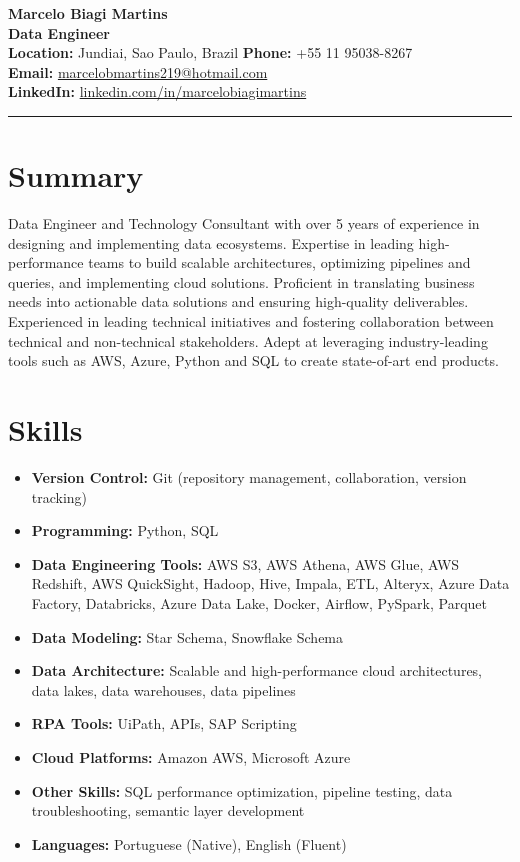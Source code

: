 \documentclass[a4paper,10pt]{article}
\begin{document}
\begin{center}
    {\LARGE \textbf{Marcelo Biagi Martins}} \\
    {\large \textbf{Data Engineer}} \\
    \textbf{Location:} Jundiai, Sao Paulo, Brazil \textbar \hspace{0.1em} \textbf{Phone:} +55 11 95038-8267 \\
    \textbf{Email:} \href{mailto:marcelobmartins219@hotmail.com}{marcelobmartins219@hotmail.com} \\
    \textbf{LinkedIn:} \href{https://www.linkedin.com/in/marcelo-biagi-martins-aa5a7616b/}{linkedin.com/in/marcelobiagimartins} \\
\end{center}

\hrule
\vspace{1em}

\section*{Summary}
Data Engineer and Technology Consultant with over 5 years of experience in designing and implementing data ecosystems. Expertise in leading high-performance teams to build scalable architectures, optimizing pipelines and queries, and implementing cloud solutions. Proficient in translating business needs into actionable data solutions and ensuring high-quality deliverables. Experienced in leading technical initiatives and fostering collaboration between technical and non-technical stakeholders. Adept at leveraging industry-leading tools such as AWS, Azure, Python and SQL to create state-of-art end products.

\section*{Skills}
\begin{itemize}[leftmargin=*]
    \item \textbf{Version Control:} Git (repository management, collaboration, version tracking)
    \item \textbf{Programming:} Python, SQL
    \item \textbf{Data Engineering Tools:} AWS S3, AWS Athena, AWS Glue, AWS Redshift, AWS QuickSight, Hadoop, Hive, Impala, ETL, Alteryx, Azure Data Factory, Databricks, Azure Data Lake, Docker, Airflow, PySpark, Parquet
    \item \textbf{Data Modeling:} Star Schema, Snowflake Schema
    \item \textbf{Data Architecture:} Scalable and high-performance cloud architectures, data lakes, data warehouses, data pipelines
    \item \textbf{RPA Tools:} UiPath, APIs, SAP Scripting
    \item \textbf{Cloud Platforms:} Amazon AWS, Microsoft Azure
    \item \textbf{Other Skills:} SQL performance optimization, pipeline testing, data troubleshooting, semantic layer development
    \item \textbf{Languages:} Portuguese (Native), English (Fluent)
\end{itemize}
\end{document}
